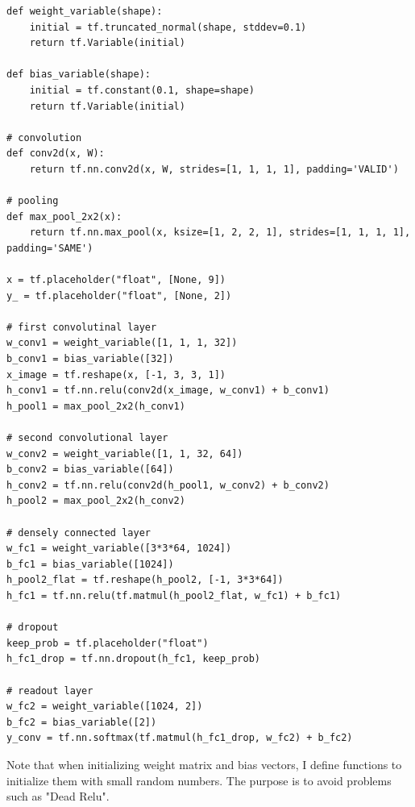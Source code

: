 \documentclass[a4paper]{article}
\begin{document}
\begin{verbatim}
def weight_variable(shape):
    initial = tf.truncated_normal(shape, stddev=0.1)
    return tf.Variable(initial)

def bias_variable(shape):
    initial = tf.constant(0.1, shape=shape)
    return tf.Variable(initial)

# convolution
def conv2d(x, W):
    return tf.nn.conv2d(x, W, strides=[1, 1, 1, 1], padding='VALID')

# pooling
def max_pool_2x2(x):
    return tf.nn.max_pool(x, ksize=[1, 2, 2, 1], strides=[1, 1, 1, 1], padding='SAME')

x = tf.placeholder("float", [None, 9])
y_ = tf.placeholder("float", [None, 2])

# first convolutinal layer
w_conv1 = weight_variable([1, 1, 1, 32])
b_conv1 = bias_variable([32])
x_image = tf.reshape(x, [-1, 3, 3, 1])
h_conv1 = tf.nn.relu(conv2d(x_image, w_conv1) + b_conv1)
h_pool1 = max_pool_2x2(h_conv1)

# second convolutional layer
w_conv2 = weight_variable([1, 1, 32, 64])
b_conv2 = bias_variable([64])
h_conv2 = tf.nn.relu(conv2d(h_pool1, w_conv2) + b_conv2)
h_pool2 = max_pool_2x2(h_conv2)

# densely connected layer
w_fc1 = weight_variable([3*3*64, 1024])
b_fc1 = bias_variable([1024])
h_pool2_flat = tf.reshape(h_pool2, [-1, 3*3*64])
h_fc1 = tf.nn.relu(tf.matmul(h_pool2_flat, w_fc1) + b_fc1)

# dropout
keep_prob = tf.placeholder("float")
h_fc1_drop = tf.nn.dropout(h_fc1, keep_prob)

# readout layer
w_fc2 = weight_variable([1024, 2])
b_fc2 = bias_variable([2])
y_conv = tf.nn.softmax(tf.matmul(h_fc1_drop, w_fc2) + b_fc2)

\end{verbatim}
Note that when initializing weight matrix and bias vectors, I define functions to initialize them with small random numbers. The purpose is to avoid problems such as "Dead Relu".
\end{document}
